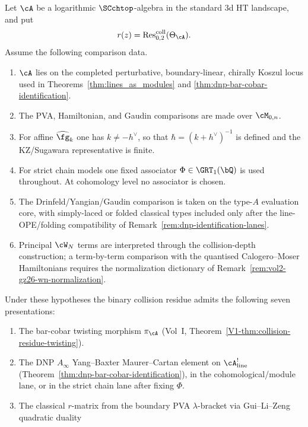 \begin{theorem}
\label{thm:seven-face-master-3d-ht}
\label{thm:vol2-seven-faces-master}
Let $\cA$ be a logarithmic $\SCchtop$-algebra in the standard 3d HT
landscape, and put
\[
r(z)=\operatorname{Res}^{\mathrm{coll}}_{0,2}(\Theta_\cA).
\]
Assume the following comparison data.
\begin{enumerate}[label=\textup{(H\arabic*)},start=0]
\item $\cA$ lies on the completed perturbative, boundary-linear,
chirally Koszul locus used in Theorems~\ref{thm:lines_as_modules} and
\ref{thm:dnp-bar-cobar-identification}.
\item The PVA, Hamiltonian, and Gaudin comparisons are made over
$\cM_{0,n}$.
\item For affine $\widehat{\fg}_k$ one has $k\neq -h^\vee$, so that
$\hbar=(k+h^\vee)^{-1}$ is defined and the KZ/Sugawara representative
is finite.
\item For strict chain models one fixed associator
$\Phi\in \GRT_1(\bQ)$ is used throughout.  At cohomology level no
associator is chosen.
\item The Drinfeld/Yangian/Gaudin comparison is taken on the
type-$A$ evaluation core, with simply-laced or folded classical types
included only after the line-OPE/folding compatibility of
Remark~\ref{rem:dnp-identification-lanes}.
\item Principal $\cW_N$ terms are interpreted through the
collision-depth construction; a term-by-term comparison with
the quantised Calogero--Moser Hamiltonians requires the normalization dictionary of
Remark~\ref{rem:vol2-gz26-wn-normalization}.
\end{enumerate}
Under these hypotheses the binary collision residue admits the
following seven presentations:
\begin{enumerate}[label=\textup{(F\arabic*)}]
\item The bar-cobar twisting morphism $\pi_\cA$
 \textup{(}Vol~I, Theorem~\textup{\ref{V1-thm:collision-residue-twisting}}\textup{)}.
\item The DNP $A_\infty$ Yang--Baxter Maurer--Cartan element on
 $\cA^!_{\mathrm{line}}$
 \textup{(}Theorem~\textup{\ref{thm:dnp-bar-cobar-identification}}\textup{)},
 in the cohomological/module lane, or in the strict chain lane after
 fixing $\Phi$.
\item The classical $r$-matrix from the boundary PVA $\lambda$-bracket
 via Gui--Li--Zeng quadratic duality

\end{enumerate}
\end{theorem}
